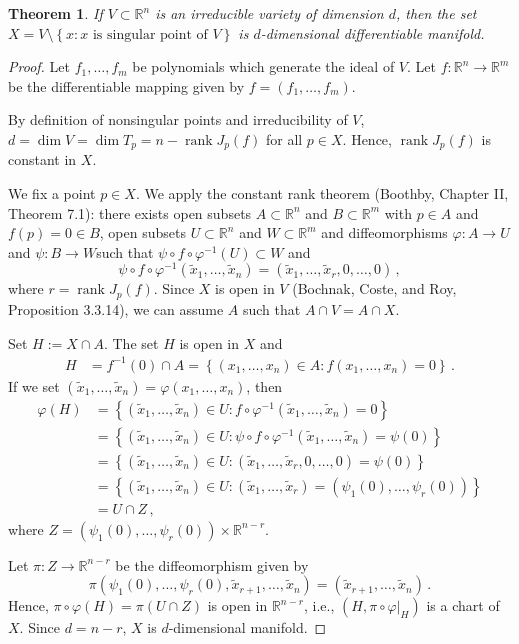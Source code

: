 \documentclass[a4paper, 11pt]{article}
\newcommand{\RR}{\mathbb{R}}
\DeclareMathOperator{\rank}{rank}
\newtheorem{thm}{Theorem}[section]
\theoremstyle{definition}
\begin{document}
\begin{thm}
\label{thm:varietyIsManifold}
If $V\subset \RR^n$ is an irreducible variety of dimension $d$, then the set $X=V\setminus\left\{x\colon x \text{ is singular point of } V\right\}$ is $d$-dimensional differentiable manifold.
\end{thm}
\begin{proof}
Let $f_1,\dots, f_m$ be polynomials which generate the ideal of $V$. Let $f:\RR^n\rightarrow\RR^m$ be the differentiable mapping given by $f=(f_1,\dots,f_m)$. 

By definition of nonsingular points and irreducibility of $V$, $d=\dim V=\dim T_p=n-\rank J_p(f)$ for all $p\in X$. Hence, $\rank J_p(f)$ is constant in $X$. 

We fix a point $p\in X$. We apply the constant rank theorem (Boothby, Chapter II, Theorem 7.1): there exists open subsets $A\subset \RR^n$ and $B\subset \RR^m$ with $p\in A$ and $f(p)=0\in B$, open subsets $U\subset \RR^n$ and $W\subset \RR^m$ and diffeomorphisms $\varphi:A\rightarrow U$ and $\psi:B\rightarrow W$such that $\psi \circ f \circ \varphi^{-1}(U)\subset W$ and 
$$
\psi \circ f \circ \varphi^{-1}(\tilde{x}_1,\dots, \tilde{x}_n)=(\tilde{x}_1,\dots, \tilde{x}_r, 0, \dots, 0)\,,
$$
where $r=\rank J_p(f)$. Since $X$ is open in $V$ (Bochnak, Coste, and Roy, Proposition 3.3.14), we can assume $A$ such that $A\cap V=A\cap X$.

Set $H:= X\cap A$. The set $H$ is open in $X$ and
\begin{align*}
 H &=f^{-1}(0) \cap A = \left\{(x_1,\dots, x_n)\in A \colon f(x_1,\dots, x_n)=0\right\}\,.
\end{align*}
If we set $(\tilde{x}_1,\dots, \tilde{x}_n)=\varphi(x_1,\dots, x_n)$, then
\begin{align*} 
\varphi(H) &= \left\{(\tilde{x}_1,\dots, \tilde{x}_n)\in U \colon f\circ \varphi^{-1}(\tilde{x}_1,\dots, \tilde{x}_n)=0\right\} \\
 &= \left\{(\tilde{x}_1,\dots, \tilde{x}_n)\in U \colon \psi \circ f\circ \varphi^{-1}(\tilde{x}_1,\dots, \tilde{x}_n)=\psi(0)\right\} \\
 &= \left\{(\tilde{x}_1,\dots, \tilde{x}_n)\in U \colon (\tilde{x}_1,\dots, \tilde{x}_r, 0, \dots, 0)=\psi(0)\right\} \\
 &= \left\{(\tilde{x}_1,\dots, \tilde{x}_n)\in U \colon (\tilde{x}_1,\dots, \tilde{x}_r)=(\psi_1(0),\dots , \psi_r(0))\right\}\\
 &= U \cap Z \,,
\end{align*}
where $Z= (\psi_1(0),\dots , \psi_r(0)) \times \RR^{n-r}$.

Let  $\pi:Z\rightarrow \RR^{n-r}$ be the diffeomorphism given by 
$$\pi(\psi_1(0),\dots , \psi_r(0),\tilde{x}_{r+1},\dots, \tilde{x}_n)=(\tilde{x}_{r+1},\dots, \tilde{x}_n)\,.
$$
Hence, $\pi\circ \varphi (H)= \pi( U \cap Z )$ is open in $\RR^{n-r}$, i.e., $(H,\pi\circ\varphi|_H)$ is a chart of $X$. Since $d=n-r$, $X$ is $d$-dimensional manifold.
\end{proof}
\end{document}
